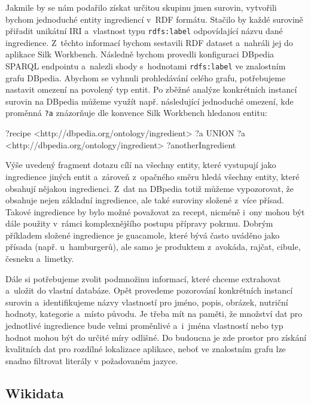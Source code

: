 Jakmile by se nám podařilo získat určitou skupinu jmen surovin, vytvořili bychom jednoduché entity ingrediencí v~RDF formátu. Stačilo by každé surovině přiřadit unikátní IRI a~vlastnost typu \texttt{rdfs:label} odpovídající názvu dané ingredience. Z~těchto informací bychom sestavili RDF dataset a~nahráli jej do aplikace Silk Workbench. Následně bychom provedli konfiguraci DBpedia SPARQL endpointu a~nalezli shody s~hodnotami \texttt{rdfs:label} ve znalostním grafu DBpedia. Abychom se vyhnuli prohledávání celého grafu, potřebujeme nastavit omezení na povolený typ entit. Po zběžné analýze konkrétních instancí surovin na DBpedia můžeme využít např. následující jednoduché omezení, kde proměnná \texttt{?a} znázorňuje dle konvence Silk Workbench hledanou entitu:

\begin{code}
{ 
    {
        ?recipe <http://dbpedia.org/ontology/ingredient> ?a
    } UNION {
        ?a <http://dbpedia.org/ontology/ingredient> ?anotherIngredient
    } 
}
\end{code}

Výše uvedený fragment dotazu cílí na všechny entity, které vystupují jako ingredience jiných entit a~zároveň z~opačného směru hledá všechny entity, které obsahují nějakou ingredienci. Z~dat na DBpedia totiž můžeme vypozorovat, že obsahuje nejen základní ingredience, ale také suroviny složené z~více přísad. Takové ingredience by bylo možné považovat za recept, nicméně i~ony mohou být dále použity v~rámci komplexnějšího postupu přípravy pokrmu. Dobrým příkladem složené ingredience je guacamole, které bývá často uváděno jako přísada (např. u~hamburgerů), ale samo je produktem z~avokáda, rajčat, cibule, česneku a~limetky.

Dále si potřebujeme zvolit podmnožinu informací, které chceme extrahovat a~uložit do vlastní databáze. Opět provedeme pozorování konkrétních instancí surovin a~identifikujeme názvy vlastností pro jméno, popis, obrázek, nutriční hodnoty, kategorie a~místo původu. Je třeba mít na paměti, že množství dat pro jednotlivé ingredience bude velmi proměnlivé a~i~jména vlastností nebo typ hodnot mohou být do určité míry odlišné. Do budoucna je zde prostor pro získání kvalitních dat pro rozdílné lokalizace aplikace, neboť ve znalostním grafu lze snadno filtrovat literály v požadovaném jazyce.

\subsection{Wikidata}


